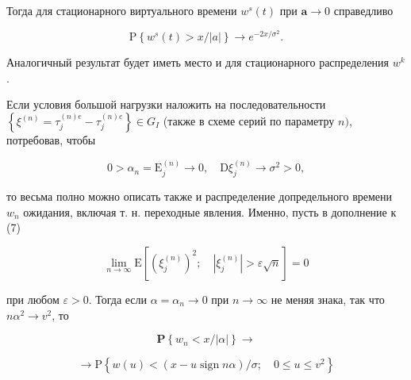 \documentclass[10pt]{article}
\begin{document}
Тогда для стационарного виртуального времени $w^{s}(t)$ при $\boldsymbol{a} \rightarrow 0$ справедливо



\[

\mathrm{P}\left\{w^{s}(t)>x /|a|\right\} \rightarrow e^{-2 x / \sigma^{2}} .

\]



Аналогичный результат будет иметь место и для стационарного распределения $w^{k}$.



Если условия большой нагрузки наложить на последовательности $\left\{\xi^{(n)}=\tau_{j}^{(n) e}-\tau_{j}^{(n) e}\right\} \in G_{I}$ (также в схеме серий по параметру $n)$, потребовав, чтобы



\[

0>\alpha_{n}=\mathrm{E}_{j}^{(n)} \longrightarrow 0, \quad \mathrm{D} \xi_{j}^{(n)} \longrightarrow \sigma^{2}>0,

\]



то весьма полно можно описать также и распределение допредельного времени $w_{n}$ ожидания, включая т. н. переходные явления. Именно, пусть в дополнение к (7)



\[

\lim _{n \rightarrow \infty} \mathrm{E}\left[\left(\xi_{j}^{(n)}\right)^{2} ; \quad\left|\xi_{j}^{(n)}\right|>\varepsilon \sqrt{n}\right]=0

\]



при любом $\varepsilon>0$. Тогда если $\alpha=\alpha_{n} \rightarrow 0$ при $n \rightarrow \infty$ не меняя знака, так что $n \alpha^{2} \rightarrow v^{2}$, то



\[

\mathbf{P}\left\{w_{n}<x /|\alpha|\right\} \rightarrow

\]



\[

\longrightarrow \mathrm{P}\left\{w(u)<(x-u \operatorname{sign} n \alpha) / \sigma ; \quad 0 \leqslant u \leqslant v^{2}\right\}

\]
\end{document}
